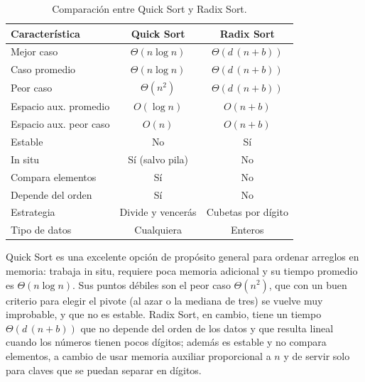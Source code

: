 \begin{table}[htbp]
  \centering
  \caption{Comparación entre Quick Sort y Radix Sort.}
  \begin{tabular}{lcc}
    \toprule
    \textbf{Característica} & \textbf{Quick Sort} & \textbf{Radix Sort} \\
    \midrule
    Mejor caso             & $\Theta(n \log n)$ & $\Theta(d\,(n + b))$ \\
    Caso promedio          & $\Theta(n \log n)$ & $\Theta(d\,(n + b))$ \\
    Peor caso              & $\Theta(n^2)$      & $\Theta(d\,(n + b))$ \\
    Espacio aux. promedio  & $O(\log n)$        & $O(n + b)$ \\
    Espacio aux. peor caso & $O(n)$             & $O(n + b)$ \\
    Estable                & No                 & Sí \\
    In situ                & Sí (salvo pila)    & No \\
    Compara elementos      & Sí                 & No \\
    Depende del orden      & Sí                 & No \\
    Estrategia             & Divide y vencerás  & Cubetas por dígito \\
    Tipo de datos          & Cualquiera         & Enteros \\
    \bottomrule
  \end{tabular}
\end{table}

Quick Sort es una excelente opción de propósito general para ordenar arreglos en memoria: trabaja in situ, requiere poca memoria adicional y su tiempo promedio es $\Theta(n \log n)$. Sus puntos débiles son el peor caso $\Theta(n^2)$, que con un buen criterio para elegir el pivote (al azar o la mediana de tres) se vuelve muy improbable, y que no es estable. Radix Sort, en cambio, tiene un tiempo $\Theta(d\,(n + b))$ que no depende del orden de los datos y que resulta lineal cuando los números tienen pocos dígitos; además es estable y no compara elementos, a cambio de usar memoria auxiliar proporcional a $n$ y de servir solo para claves que se puedan separar en dígitos.